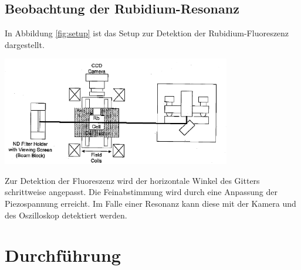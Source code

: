 \documentclass[captions=tableheading]{scrartcl}
\begin{document}
\subsection{Beobachtung der Rubidium-Resonanz}
In Abbildung \ref{fig:setup} ist das Setup zur Detektion der Rubidium-Fluoreszenz dargestellt.
\begin{center}
	\includegraphics[width=10cm]{images/setup.png}
	\label{fig:setup}
\end{center}
Zur Detektion der Fluoreszenz wird der horizontale Winkel des Gitters schrittweise angepasst. Die Feinabstimmung wird durch eine Anpassung der Piezospannung erreicht. Im Falle einer Resonanz kann diese mit der Kamera und des Oszilloskop detektiert werden. \\

\section{Durchführung}
\end{document}
